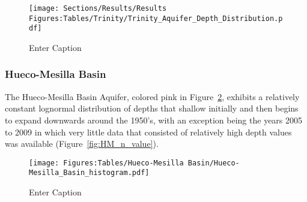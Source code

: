 \begin{figure}[H]
    \centering
    \texttt{[image: Sections/Results/Results Figures:Tables/Trinity/Trinity\_Aquifer\_Depth\_Distribution.pdf]}
    \caption{Enter Caption}
    \label{fig:TR_Histo}
\end{figure}

\subsubsection*{Hueco-Mesilla Basin}
The Hueco-Mesilla Basin Aquifer, colored pink in Figure~\ref{fig:HM_Histo}, exhibits a relatively constant lognormal distribution of depths that shallow initially and then begins to expand downwards around the 1950’s, with an exception being the years 2005 to 2009 in which very little data that consisted of relatively high depth values was available (Figure~\ref{fig:HM_n_value}). 

\begin{figure}[H]
    \centering
    \texttt{[image: Figures:Tables/Hueco-Mesilla Basin/Hueco-Mesilla\_Basin\_histogram.pdf]}
    \caption{Enter Caption}
    \label{fig:HM_Histo}
\end{figure}
